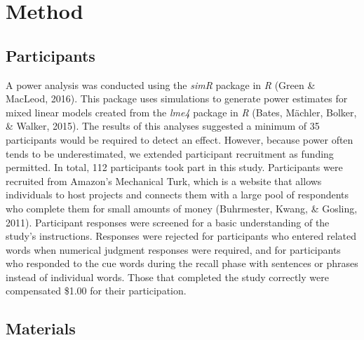 \documentclass[english,,man]{apa6}
\begin{document}
\section{Method}\label{method}

\subsection{Participants}\label{participants}

A power analysis was conducted using the \emph{simR} package in \emph{R}
(Green \& MacLeod, 2016). This package uses simulations to generate
power estimates for mixed linear models created from the \emph{lme4}
package in \emph{R} (Bates, Mächler, Bolker, \& Walker, 2015). The
results of this analyses suggested a minimum of 35 participants would be
required to detect an effect. However, because power often tends to be
underestimated, we extended participant recruitment as funding
permitted. In total, 112 participants took part in this study.
Participants were recruited from Amazon's Mechanical Turk, which is a
website that allows individuals to host projects and connects them with
a large pool of respondents who complete them for small amounts of money
(Buhrmester, Kwang, \& Gosling, 2011). Participant responses were
screened for a basic understanding of the study's instructions.
Responses were rejected for participants who entered related words when
numerical judgment responses were required, and for participants who
responded to the cue words during the recall phase with sentences or
phrases instead of individual words. Those that completed the study
correctly were compensated \$1.00 for their participation.

\subsection{Materials}\label{materials}
\end{document}
